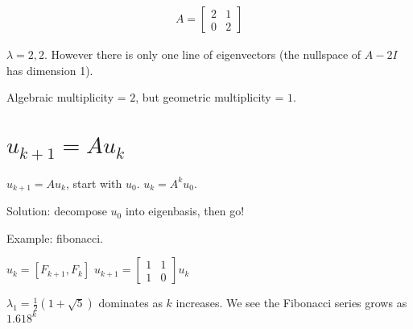 \documentclass{article}
\begin{document}
\begin{align}
A = 
\begin{bmatrix}
2 & 1 \\
0 & 2
\end{bmatrix}
\end{align}

$\lambda = 2,2$. However there is only one line of eigenvectors (the nullspace of $A - 2I$ has dimension 1).

Algebraic multiplicity = $2$, but geometric multiplicity = $1$.

\section{$u_{k+1} = A u_k$}

$u_{k+1} = A u_k$, start with $u_0$. $u_k = A^k u_0$.

Solution: decompose $u_0$ into eigenbasis, then go!

Example: fibonacci. 

$u_k = [F_{k+1}, F_k]$
$u_{k+1} = \begin{bmatrix}
1 & 1 \\
1 & 0
\end{bmatrix} u_k$

$\lambda_1 = \frac{1}{2} (1 + \sqrt{5})$ dominates as $k$ increases. We see the Fibonacci series grows as $1.618^ k$
\end{document}
